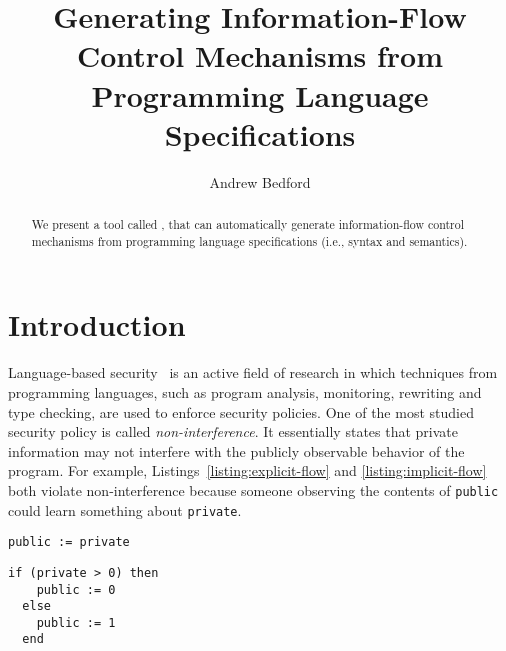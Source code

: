 \documentclass[sigplan,10pt]{acmart}\settopmatter{printfolios=true,printccs=false,printacmref=false}
\begin{document}
\title[ott-ifc]{Generating Information-Flow Control Mechanisms from Programming Language Specifications}


\author{Andrew Bedford}


\begin{abstract}
We present a tool called \ottifc, that can automatically generate information-flow control mechanisms from programming language specifications (i.e., syntax and semantics).
\end{abstract}

\maketitle

\section{Introduction}
Language-based security~\cite{DBLP:conf/dagstuhl/SchneiderMH01} is an active field of research in which techniques from programming languages, such as program analysis, monitoring, rewriting and type checking, are used to enforce security policies. One of the most studied security policy is called \emph{non-interference}. It essentially states that private information may not interfere with the publicly observable behavior of the program. For example, Listings~\ref{listing:explicit-flow} and \ref{listing:implicit-flow} both violate non-interference because someone observing the contents of \lstinline{public} could learn something about \lstinline{private}.

\begin{lstlisting}[captionpos=b, caption=Insecure explicit flow, label=listing:explicit-flow]
  public := private
\end{lstlisting}

\begin{lstlisting}[captionpos=b, caption=Insecure implicit flow, label=listing:implicit-flow]
  if (private > 0) then
    public := 0
  else
    public := 1
  end
\end{lstlisting}
\end{document}
